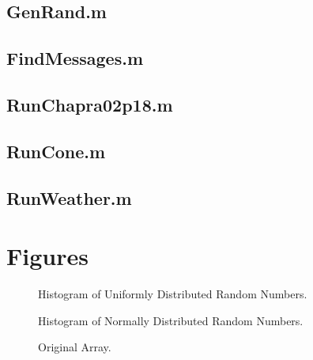 \documentclass{article}
\begin{document}


\subsection{GenRand.m}
\clearpage
\subsection{FindMessages.m}
\clearpage
\subsection{RunChapra02p18.m}
\clearpage
\subsection{RunCone.m}
\clearpage
\subsection{RunWeather.m}

\clearpage %

\section{Figures}

\begin{figure}[ht!]
\begin{center}
\caption{Histogram of Uniformly Distributed Random Numbers.}
\end{center}
\end{figure}

\begin{figure}[ht!]
\begin{center}
\caption{Histogram of Normally Distributed Random Numbers.}
\end{center}
\end{figure}

\begin{figure}[ht!]
\begin{center}
\caption{Original Array.}
\end{center}
\end{figure}
\end{document}
